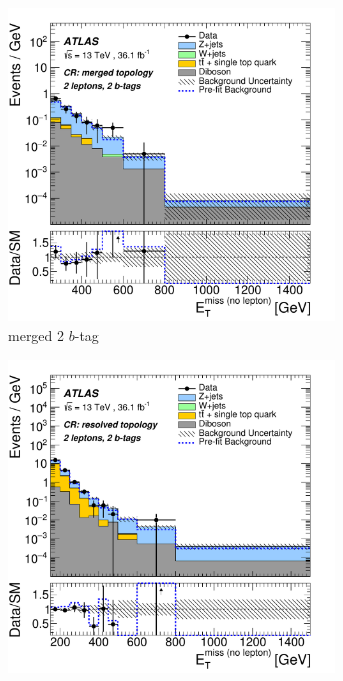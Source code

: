 \begin{figure}[htbp]
  \begin{subfigure}{0.45\textwidth}
    \centering
    \includegraphics[width=0.95\textwidth]{figures/monoV/results/figaux_09e.pdf}
    \caption{merged 2 \(b\)-tag}
  \end{subfigure}
  \begin{subfigure}{0.45\textwidth}
    \centering
    \includegraphics[width=0.95\textwidth]{figures/monoV/results/figaux_09f.pdf}

\end{subfigure}
\end{figure}
